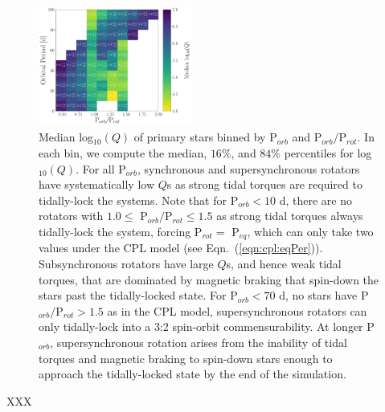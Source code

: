 \documentclass[twocolumn]{aastex61}
\begin{document}
\begin{figure}
	\includegraphics[width=0.45\textwidth]{../Plots/porbProtPorbQHist.pdf}
   \caption{Median log$_{10}(Q)$ of primary stars binned by P$_{orb}$ and P$_{orb}/$P$_{rot}$.  In each bin, we compute the median, $16\%$, and $84\%$ percentiles for log$_{10}(Q)$. For all P$_{orb}$, synchronous and supersynchronous rotators have systematically low $Q$s as strong tidal torques are required to tidally-lock the systems. Note that for P$_{orb} < 10$ d, there are no rotators with $1.0 \leq$ P$_{orb}/$P$_{rot} \leq 1.5$ as strong tidal torques always tidally-lock the system, forcing P$_{rot} =$ P$_{eq}$, which can only take two values under the CPL model (see Eqn.~(\ref{eqn:cpl:eqPer})). Subsynchronous rotators have large $Q$s, and hence weak tidal torques, that are dominated by magnetic braking that spin-down the stars past the tidally-locked state.  For P$_{orb} < 70$ d, no stars have P$_{orb}/$P$_{rot} > 1.5$ as in the CPL model, supersynchronous rotators can only tidally-lock into a 3:2 spin-orbit commensurability.  At longer P$_{orb}$, supersynchronous rotation arises from the inability of tidal torques and magnetic braking to spin-down stars enough to approach the tidally-locked state by the end of the simulation.}%
    \label{fig:qmap}%
\end{figure}

XXX
\end{document}
